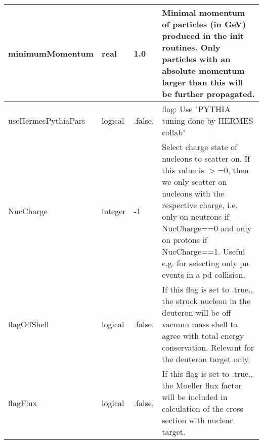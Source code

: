 \documentclass{article}
\begin{document}
\begin{longtable}{llll}
\midrule
minimumMomentum & \begin{minipage}[t]{2cm}real\end{minipage} & \begin{minipage}[t]{2cm}1.0\end{minipage} & \begin{minipage}[t]{12cm}Minimal momentum of particles (in GeV) produced in the init routines. Only particles with an absolute momentum larger than this will be further propagated.\end{minipage}\\*
\midrule
useHermesPythiaPars & \begin{minipage}[t]{2cm}logical\end{minipage} & \begin{minipage}[t]{2cm}.false.\end{minipage} & \begin{minipage}[t]{12cm}flag: Use "PYTHIA tuning done by HERMES collab"\end{minipage}\\*
\midrule
NucCharge & \begin{minipage}[t]{2cm}integer\end{minipage} & \begin{minipage}[t]{2cm}-1\end{minipage} & \begin{minipage}[t]{12cm}Select charge state of nucleons to scatter on. If this value is $>$=0, then we only scatter on nucleons with the respective charge, i.e. only on neutrons if NucCharge==0 and only on protons if NucCharge==1. Useful e.g. for selecting only pn events in a pd collision.\end{minipage}\\*
\midrule
flagOffShell & \begin{minipage}[t]{2cm}logical\end{minipage} & \begin{minipage}[t]{2cm}.false.\end{minipage} & \begin{minipage}[t]{12cm}If this flag is set to .true., the struck nucleon in the deuteron will be off vacuum mass shell to agree with total energy conservation. Relevant for the deuteron target only.\end{minipage}\\*
\midrule
flagFlux & \begin{minipage}[t]{2cm}logical\end{minipage} & \begin{minipage}[t]{2cm}.false.\end{minipage} & \begin{minipage}[t]{12cm}If this flag is set to .true., the Moeller flux factor will be included in calculation of the cross section with nuclear target.\end{minipage}\\*

\end{longtable}
\end{document}
